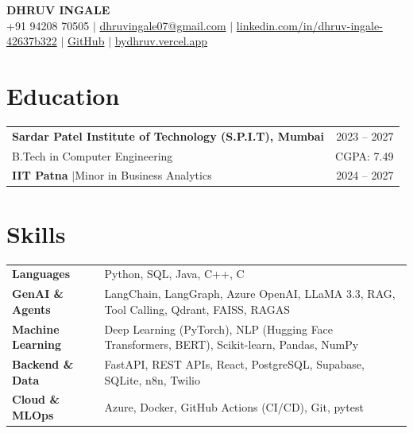 \documentclass[a4paper,10pt]{article}
\newcommand{\sep}{\unskip\hspace{0.5em}$|$\hspace{0.5em}\ignorespaces}
\begin{document}

\begin{center}
    {\Huge\textbf{DHRUV INGALE}}\\[6pt]
    \small
    +91 94208 70505 \sep
    \href{mailto:dhruvingale07@gmail.com}{dhruvingale07@gmail.com} \sep
    \href{https://linkedin.com/in/dhruv-ingale-42637b322}{linkedin.com/in/dhruv-ingale-42637b322} \sep
    \href{https://github.com/USERNAME}{GitHub} \sep
    \href{https://bydhruv.vercel.app/}{bydhruv.vercel.app}
\end{center}

\vspace{-6pt}


\section*{Education}
{\renewcommand{\arraystretch}{1.3}
\begin{tabularx}{\linewidth}{@{}Xr@{}}
\textbf{Sardar Patel Institute of Technology (S.P.I.T), Mumbai} & 2023 -- 2027 \\
B.Tech in Computer Engineering & CGPA: 7.49 \\
\textbf{IIT Patna} \sep Minor in Business Analytics & 2024 -- 2027 \\
\end{tabularx}}


\section*{Skills}
{\renewcommand{\arraystretch}{1.3}
\begin{tabularx}{\linewidth}{@{}>{\bfseries}l X@{}}
Languages        & Python, SQL, Java, C++, C \\
GenAI \& Agents  & LangChain, LangGraph, Azure OpenAI, LLaMA 3.3, RAG, Tool Calling, Qdrant, FAISS, RAGAS \\
Machine Learning & Deep Learning (PyTorch), NLP (Hugging Face Transformers, BERT), Scikit-learn, Pandas, NumPy \\
Backend \& Data  & FastAPI, REST APIs, React, PostgreSQL, Supabase, SQLite, n8n, Twilio \\
Cloud \& MLOps   & Azure, Docker, GitHub Actions (CI/CD), Git, pytest \\
\end{tabularx}}
\end{document}

